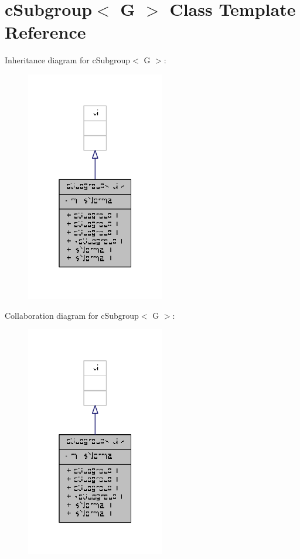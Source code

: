 \hypertarget{classcSubgroup}{\section{c\-Subgroup$<$ G $>$ Class Template Reference}
\label{classcSubgroup}
}


Inheritance diagram for c\-Subgroup$<$ G $>$\-:
\nopagebreak
\begin{figure}[H]
\begin{center}
\leavevmode
\includegraphics[width=172pt]{classcSubgroup__inherit__graph}
\end{center}
\end{figure}


Collaboration diagram for c\-Subgroup$<$ G $>$\-:
\nopagebreak
\begin{figure}[H]
\begin{center}
\leavevmode
\includegraphics[width=172pt]{classcSubgroup__coll__graph}
\end{center}
\end{figure}
